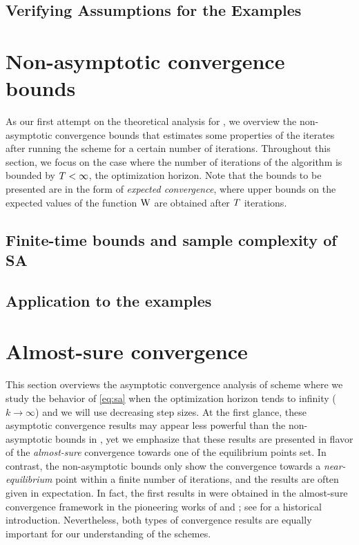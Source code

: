 \documentclass[10pt,twocolumn,twoside]{IEEEtran}
\newcommand{\revisionupdates}[1]{{\color{black} #1}}
\begin{document}
\subsection{Verifying Assumptions for the Examples}\label{sec:verif:assume}




\section{Non-asymptotic convergence bounds} \label{sec:nonasymp}
As our first attempt on the theoretical analysis for {\SA}, we overview the non-asymptotic convergence bounds that estimates some properties of the iterates after running the {\SA} scheme for a certain number of iterations. Throughout this section, we focus on the case where the number of iterations of the algorithm is bounded by $T < \infty$, the optimization horizon. 
Note that the bounds to be presented are  in the form of \emph{expected convergence}, where upper bounds on the expected values of the function ${\operatorname{W}}$ are obtained after $T$ iterations. 

\subsection{Finite-time bounds and sample complexity of SA}
\label{subsec:finite-time-bounds}

\subsection{\revisionupdates{Application to the examples}}
\label{subsec:finite-time-bounds-examples}



\section{Almost-sure convergence} \label{sec:asymptotic-convergence}
This section overviews the asymptotic convergence analysis of {\SA} scheme where we study the behavior of \eqref{eq:sa} when the optimization horizon tends to infinity ($k \to \infty$) and  we will use decreasing step sizes. At the first glance, these asymptotic convergence results may appear less powerful than the non-asymptotic bounds in , yet we emphasize that these results are presented in flavor of the \emph{almost-sure} convergence towards one of the equilibrium points set. In contrast, the non-asymptotic bounds only show the convergence towards a \emph{near-equilibrium} point within a finite number of iterations, and the results are often given in expectation. In fact, the first results in {\SA} were obtained in the almost-sure convergence framework in the pioneering works of \cite{robbins1951stochastic} and \cite{blum1954multidimensional}; see \cite[Chapter~1-2]{kushner2003stochastic} for a historical introduction. Nevertheless, both types of convergence results are equally important for our understanding of the {\SA} schemes.  
\end{document}
